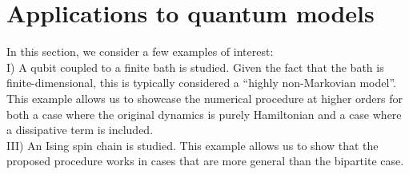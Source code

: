 \documentclass[twocolumn]{autart}    %
\newcommand{\expect}[1]{\left< #1 \right>}
\begin{document}
\section{Applications to quantum models}
\label{sec:applications}
In this section, we consider a few examples of interest:\\ 
I) A qubit coupled to a finite bath is studied. Given the fact that the bath is finite-dimensional, this is typically considered a ``highly non-Markovian model''. This example allows us to showcase the numerical procedure at higher orders for both a case where the original dynamics is purely Hamiltonian and a case where a dissipative term is included. \\
III) An Ising spin chain is studied. This example allows us to show that the proposed procedure works in cases that are more general than the bipartite case.

\end{document}
